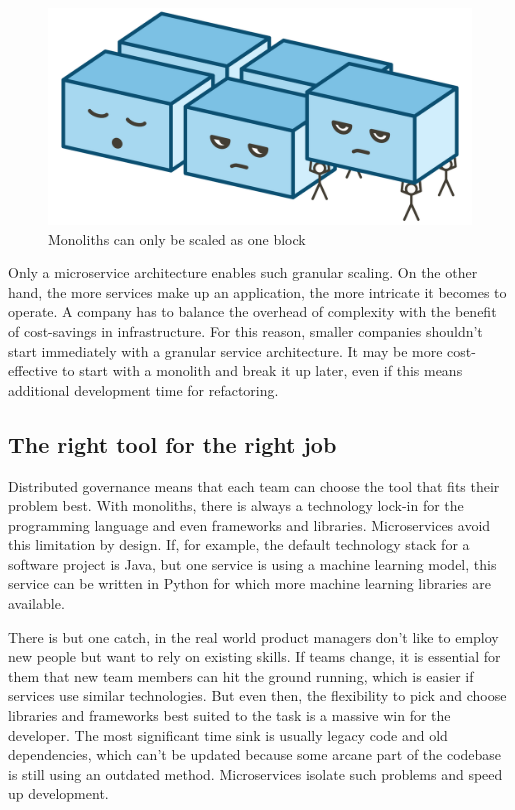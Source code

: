 \begin{figure}[ht]
  \centering
  \includegraphics[width=0.55\linewidth]{assets/illustration-monolith-scaling.png}
  \caption{Monoliths can only be scaled as one block}
\end{figure}

Only a microservice architecture enables such granular scaling. On the other hand, the more services make up an application, the more intricate it becomes to operate. A company has to balance the overhead of complexity with the benefit of cost-savings in infrastructure. For this reason, smaller companies shouldn't start immediately with a granular service architecture. It may be more cost-effective to start with a monolith and break it up later, even if this means additional development time for refactoring.


\subsection{The right tool for the right job}

Distributed governance means that each team can choose the tool that fits their problem best. With monoliths, there is always a technology lock-in for the programming language and even frameworks and libraries. Microservices avoid this limitation by design. If, for example, the default technology stack for a software project is Java, but one service is using a machine learning model, this service can be written in Python for which more machine learning libraries are available.

There is but one catch, in the real world product managers don't like to employ new people but want to rely on existing skills. If teams change, it is essential for them that new team members can hit the ground running, which is easier if services use similar technologies. But even then, the flexibility to pick and choose libraries and frameworks best suited to the task is a massive win for the developer. The most significant time sink is usually legacy code and old dependencies, which can't be updated because some arcane part of the codebase is still using an outdated method. Microservices isolate such problems and speed up development.


